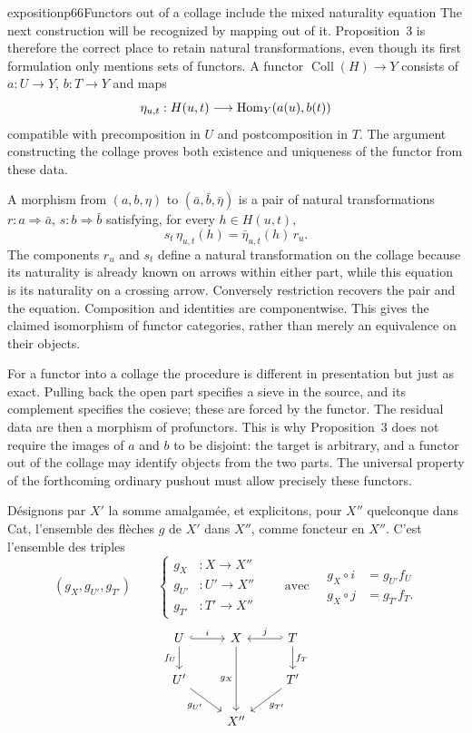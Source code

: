 \begin{dcomment}{exposition}{p66}{Functors out of a collage include the mixed naturality equation}
The next construction will be recognized by mapping out of it. Proposition~3 is therefore the correct place to retain natural transformations, even though its first formulation only mentions sets of functors. A functor $\operatorname{Coll}(H)\to Y$ consists of $a:U\to Y$, $b:T\to Y$ and maps
\[
 \eta_{u,t}:H(u,t)\longrightarrow\mathrm{Hom}_Y(a(u),b(t))
\]
compatible with precomposition in $U$ and postcomposition in $T$. The argument constructing the collage proves both existence and uniqueness of the functor from these data.

A morphism from $(a,b,\eta)$ to $(\bar a,\bar b,\bar\eta)$ is a pair of natural transformations $r:a\Rightarrow\bar a$, $s:b\Rightarrow\bar b$ satisfying, for every $h\in H(u,t)$,
\[
 s_t\,\eta_{u,t}(h)=\bar\eta_{u,t}(h)\,r_u.
\]
The components $r_u$ and $s_t$ define a natural transformation on the collage because its naturality is already known on arrows within either part, while this equation is its naturality on a crossing arrow. Conversely restriction recovers the pair and the equation. Composition and identities are componentwise. This gives the claimed isomorphism of functor categories, rather than merely an equivalence on their objects.

For a functor into a collage the procedure is different in presentation but just as exact. Pulling back the open part specifies a sieve in the source, and its complement specifies the cosieve; these are forced by the functor. The residual data are then a morphism of profunctors. This is why Proposition~3 does not require the images of $a$ and $b$ to be disjoint: the target is arbitrary, and a functor out of the collage may identify objects from the two parts. The universal property of the forthcoming ordinary pushout must allow precisely these functors.
\end{dcomment}


Désignons par $X'$ la somme amalgamée, et explicitons, pour $X''$ quelconque dans Cat, l'ensemble des flèches $g$ de $X'$ dans $X''$, comme foncteur en $X''$. C'est l'ensemble des triples
\[
(g_X, g_{U'}, g_{T'}) \qquad
\left\{\begin{aligned} g_X &: X \longrightarrow X'' \\ g_{U'} &: U' \longrightarrow X'' \\ g_{T'} &: T' \longrightarrow X''\end{aligned}\right.
\qquad \text{avec} \quad
\begin{aligned} g_X\circ i &= g_{U'} f_U \\ g_X \circ j &= g_{T'} f_T. \end{aligned}
\tag*{$(*)$}
\]
\[
\begin{tikzcd}
U \arrow[r, hook, "i"] \arrow[d, "f_U"'] & X \arrow[dd, "g_X"'] & T \arrow[l, hook', "j"'] \arrow[d, "f_T"] \\
U' \arrow[dr, "g_{U'}"'] & & T' \arrow[dl, "g_{T'}"] \\
& X'' &
\end{tikzcd}
\]

